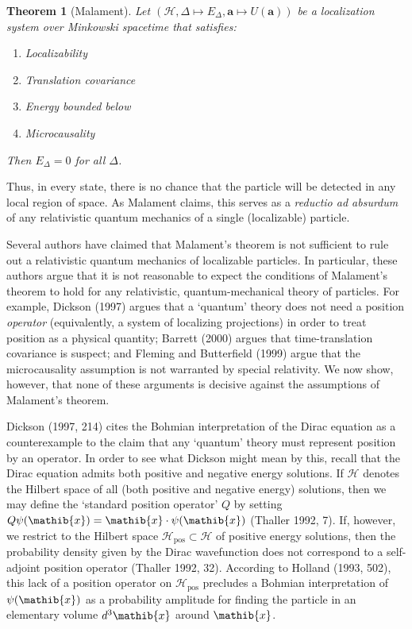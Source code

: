 \documentclass[12pt]{article}
\newtheorem*{thm*}{Theorem}
\theoremstyle{remark}
\newcommand{\hil}[1]{\mathcal{#1}}
\begin{document}
\begin{thm*}[Malament] Let $(\hil{H},\Delta \mapsto
  E_{\Delta},\mathbf{a}\mapsto U(\mathbf{a}))$ be a localization
  system over Minkowski spacetime that satisfies:
\begin{enumerate} 
\item Localizability
\item Translation covariance
\item Energy bounded below
\item Microcausality
\end{enumerate} Then $E_{\Delta}=0$ for all
$\Delta$.  \label{malament} \end{thm*}
\noindent Thus, in every state, there is no chance that the particle
will be detected in any local region of space.  As Malament claims,
this serves as a \emph{reductio ad absurdum} of any relativistic
quantum mechanics of a single (localizable) particle.

Several authors have claimed that Malament's theorem is not sufficient
to rule out a relativistic quantum mechanics of localizable particles.
In particular, these authors argue that it is not reasonable to expect
the conditions of Malament's theorem to hold for any relativistic,
quantum-mechanical theory of particles.  For example, Dickson (1997)
argues that a `quantum' theory does not need a position
\emph{operator} (equivalently, a system of localizing projections) in
order to treat position as a physical quantity; Barrett (2000) argues
that time-translation covariance is suspect; and Fleming and
Butterfield (1999) argue that the microcausality assumption is not
warranted by special relativity.  We now show, however, that none of
these arguments is decisive against the assumptions of Malament's
theorem.

Dickson (1997, 214) cites the Bohmian interpretation of the Dirac
equation as a counterexample to the claim that any `quantum' theory
must represent position by an operator.  In order to see what Dickson
might mean by this, recall that the Dirac equation admits both
positive and negative energy solutions.  If $\hil{H}$ denotes the
Hilbert space of all (both positive and negative energy) solutions,
then we may define the `standard position operator' $Q$ by setting
$Q\psi (\mathib{x})=\mathib{x}\cdot \psi (\mathib{x})$ (Thaller 1992,
7).  If, however, we restrict to the Hilbert space
$\hil{H}_{\mathrm{pos}}\subset \hil{H}$ of positive energy solutions,
then the probability density given by the Dirac wavefunction does not
correspond to a self-adjoint position operator (Thaller 1992, 32).
According to Holland (1993, 502), this lack of a position operator on
$\hil{H}_{\mathrm{pos}}$ precludes a Bohmian interpretation of $\psi
(\mathib{x})$ as a probability amplitude for finding the particle in
an elementary volume $d^{3}\mathib{x}$ around $\mathib{x}$.
\end{document}

